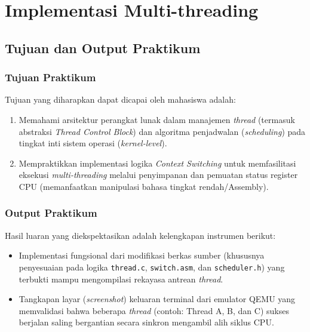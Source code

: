 
\chapter{Implementasi Multi-threading}
\label{chap:modul-08}

\section{Tujuan dan Output Praktikum}

\subsection{Tujuan Praktikum}
Tujuan yang diharapkan dapat dicapai oleh mahasiswa adalah:
\begin{enumerate}
	\item Memahami arsitektur perangkat lunak dalam manajemen \textit{thread} (termasuk abstraksi \textit{Thread Control Block}) dan algoritma penjadwalan (\textit{scheduling}) pada tingkat inti sistem operasi (\textit{kernel-level}).
	\item Mempraktikkan implementasi logika \textit{Context Switching} untuk memfasilitasi eksekusi \textit{multi-threading} melalui penyimpanan dan pemuatan status register CPU (memanfaatkan manipulasi bahasa tingkat rendah/Assembly).
\end{enumerate}

\subsection{Output Praktikum}
Hasil luaran yang diekspektasikan adalah kelengkapan instrumen berikut:
\begin{itemize}
	\item Implementasi fungsional dari modifikasi berkas sumber (khususnya penyesuaian pada logika \texttt{thread.c}, \texttt{switch.asm}, dan \texttt{scheduler.h}) yang terbukti mampu mengompilasi rekayasa antrean \textit{thread}.
	\item Tangkapan layar (\textit{screenshot}) keluaran terminal dari emulator QEMU yang memvalidasi bahwa beberapa \textit{thread} (contoh: Thread A, B, dan C) sukses berjalan saling bergantian secara sinkron mengambil alih siklus CPU.
\end{itemize}

